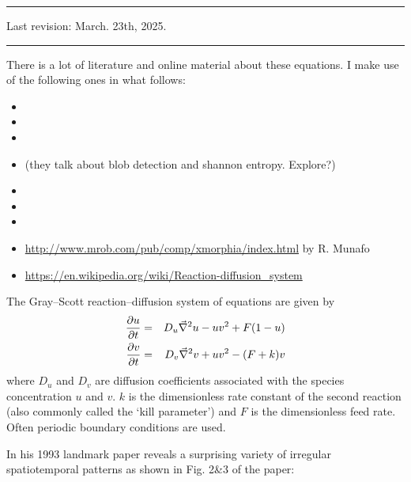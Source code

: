 \par\noindent\rule{\textwidth}{0.4pt}

Last revision: March. 23th, 2025.

\par\noindent\rule{\textwidth}{0.4pt}


There is a lot of literature and online material about these equations. I make use of the following 
ones in what follows:
\begin{itemize}
\item {}
\item {}
\item {}
\item {} (they talk about blob detection and shannon entropy. Explore?)
\item {}
\item {}
\item {}
\item \url{http://www.mrob.com/pub/comp/xmorphia/index.html} by R. Munafo
\item \url{https://en.wikipedia.org/wiki/Reaction-diffusion_system}
\end{itemize}

The Gray–Scott reaction–diffusion system of equations are given by
\begin{eqnarray}
\frac{\partial u}{\partial t} &=& D_u \vec\nabla^2 u - uv^2 + F(1-u) \nonumber\\
\frac{\partial v}{\partial t} &=& D_v \vec\nabla^2 v + uv^2 - (F+k)v
\end{eqnarray}
where $D_u$ and $D_v$ are diffusion coefficients associated with the species concentration $u$
and $v$. $k$ is the dimensionless rate constant of the second reaction (also commonly called the `kill 
parameter') and $F$ is the dimensionless feed rate.
Often periodic boundary conditions are used. 

In his 1993 landmark paper \textcite{pear93} reveals a surprising variety of 
irregular spatiotemporal patterns as shown in Fig. 2\&3 of the paper:

